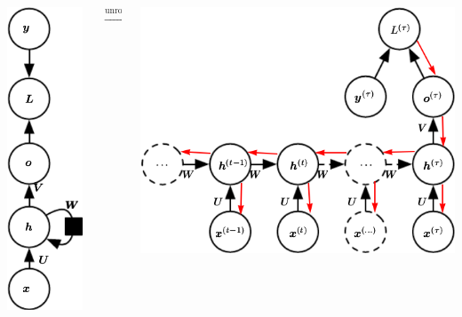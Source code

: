 \documentclass{beamer}
\begin{document}
\begin{frame}
    \begin{columns}
        \begin{column}{0.3\textwidth}
            \centering
            \includegraphics[scale=0.3]{figures/rnn1.png}
        \end{column}
        \begin{column}{0.1\textwidth}
            $\xrightarrow{\text{unroll}}$
        \end{column}
        \begin{column}{0.6\textwidth}
            \centering
            \includegraphics[scale=0.3]{figures/rnn2.png}
        \end{column}
    \end{columns}



\end{frame}
\end{document}
